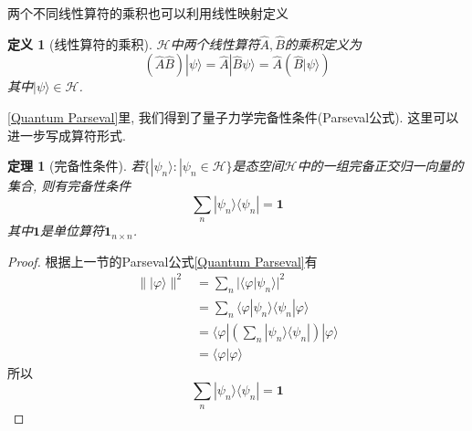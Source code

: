 \documentclass[a4paper,11pt]{article}
\newtheorem{definition}{\hspace{2em}定义}[section]
\newtheorem{theorem}{\hspace{2em}定理}[section]
\newtheorem{proof}{证明}[section]
\begin{document}
两个不同线性算符的乘积也可以利用线性映射定义\\
\begin{minipage}[b]{0.75\linewidth}
\begin{definition}[线性算符的乘积]
    $\mathcal{H}$中两个线性算符$\hat{A},\hat{B}$的乘积定义为
\begin{equation*}
  (\hat{A}\hat{B})|\psi\rangle=\hat{A}|\hat{B}\psi\rangle=\hat{A}(\hat{B}|\psi\rangle)
\end{equation*}
其中$|\psi\rangle\in\mathcal{H}$.
\end{definition}
\end{minipage}
\begin{minipage}[b]{0.25\linewidth}
\end{minipage}

\ref{Quantum Parseval}里, 我们得到了量子力学完备性条件(Parseval公式). 这里可以进一步写成算符形式.
\begin{theorem}[完备性条件]\label{Quantum Completed condition}
  若$\{|\psi_n\rangle:|\psi_n\in\mathcal{H}\}$是态空间$\mathcal{H}$中的一组完备正交归一向量的集合, 则有完备性条件
\begin{equation*}
  \sum_{n}|\psi_n\rangle\langle\psi_n|=\mathbf{1}
\end{equation*}
其中$\mathbf{1}$是单位算符$\mathbf{1}_{n\times n}$.
\end{theorem}
\begin{proof}
  根据上一节的Parseval公式\ref{Quantum Parseval}有
\begin{equation*}
  \begin{split}
     \||\varphi\rangle\|^2&=\sum_{n}|\langle\varphi|\psi_n\rangle|^2 \\
       & =\sum_{n}\langle\varphi|\psi_n\rangle\langle\psi_n|\varphi\rangle \\
       & =\langle\varphi|\left(\sum_{n}|\psi_n\rangle\langle\psi_n|\right)|\varphi\rangle \\
       & =\langle\varphi|\varphi\rangle
  \end{split}
\end{equation*}
所以
\begin{equation*}
  \sum_{n}|\psi_n\rangle\langle\psi_n|=\mathbf{1}
\end{equation*}
\end{proof}
\end{document}
